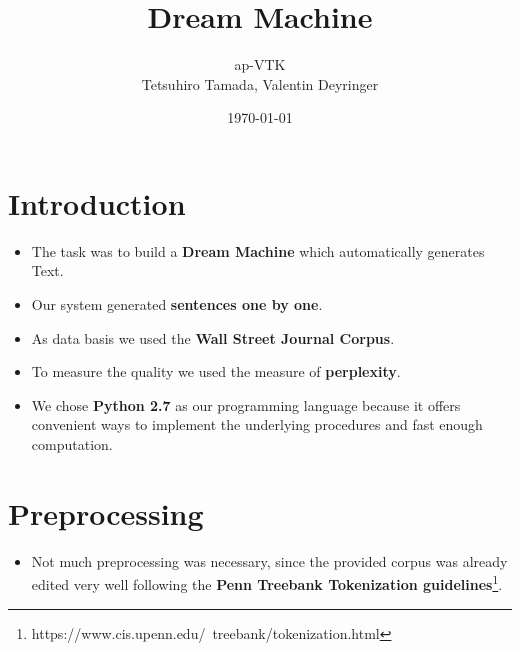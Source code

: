 \documentclass[a0,boxedsections,landscape]{sciposter}
\title{Dream Machine}
\author{ap-VTK \\ Tetsuhiro Tamada, Valentin Deyringer}
\date{\today}
\institute{
Center for Information and Language Processing, University of Munich, Germany
}
\newcommand*{\secref}[1]{\ref{#1} \nameref{#1}}
\begin{document}

\maketitle


\setlength{\columnseprule}{0pt}
\begin{multicols}{3}


\section{Introduction}
\begin{itemize}
  
    \item The task was to build a \textbf{Dream Machine} which automatically generates Text.
    
    \item Our system generated \textbf{sentences one by one}.
    
    \item As data basis we used the \textbf{Wall Street Journal Corpus}. %
  
    \item To measure the quality we used the measure of \textbf{perplexity}.
  
  
    \item We chose \textbf{Python 2.7} as our programming language because it offers convenient ways to implement the underlying procedures and fast enough computation.
  
\end{itemize}


\section{Preprocessing}

\begin{itemize}

    \item Not much preprocessing was necessary, since the provided corpus was already edited very well following the \textbf{Penn Treebank Tokenization guidelines}\footnote{https://www.cis.upenn.edu/~treebank/tokenization.html}.
    

\end{itemize}
\end{multicols}
\end{document}
